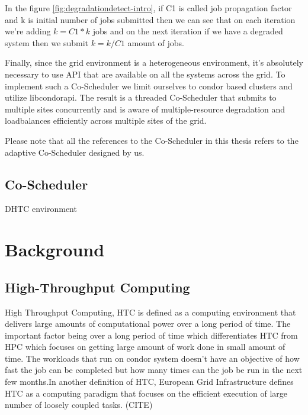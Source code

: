 \documentclass[ms,electronic,double]{nuthesis}
\begin{document}
In the figure \ref{fig:degradationdetect-intro}, if C1 is called job propagation factor and k is initial number of 
jobs submitted then we can see that on each iteration we're adding $k = C1 * k$ jobs and on the
next iteration if we have a degraded system then we submit $k=k/C1$ amount of 
jobs.

Finally, since the grid environment is a heterogeneous environment, it's absolutely necessary
to use API that are available on all the systems across the grid. To implement such a Co-Scheduler
 we limit ourselves to condor based clusters and utilize libcondorapi. The result is a threaded Co-Scheduler 
that submits to multiple sites concurrently and is aware of multiple-resource degradation and
loadbalances efficiently across multiple sites of the grid. 

Please note that all the references to the Co-Scheduler in this thesis refers to the adaptive Co-Scheduler designed 
by us.  
\section{Co-Scheduler}

DHTC environment


\chapter{Background}

\section{High-Throughput Computing} High Throughput Computing, HTC is defined as 
a computing environment that delivers large amounts of computational
power over a long period of time.  The important factor being over a long period of time which 
differentiates HTC from HPC which focuses on getting large amount of work done in small amount of time.
The workloads that run on condor system doesn't have an objective of  how fast the job can be completed 
but how many times can the job be run in the next few months.In another definition of HTC, European Grid  
Infrastructure defines HTC as a computing paradigm that focuses on the efficient 
execution of large number of loosely coupled tasks. (CITE)
\end{document}

